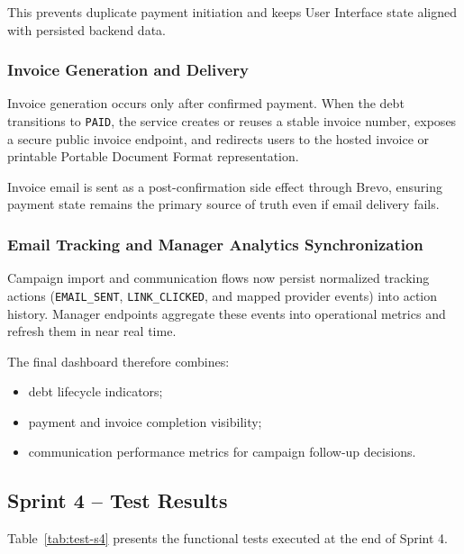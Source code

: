 \documentclass[12pt,a4paper]{report}
\begin{document}
This prevents duplicate payment initiation and keeps User Interface state aligned with persisted backend data.

\subsubsection{Invoice Generation and Delivery}

Invoice generation occurs only after confirmed payment.
When the debt transitions to \texttt{PAID}, the service creates or reuses a stable
invoice number, exposes a secure public invoice endpoint, and redirects users to the
hosted invoice or printable Portable Document Format representation.

Invoice email is sent as a post-confirmation side effect through Brevo,
ensuring payment state remains the primary source of truth even if email delivery fails.

\subsubsection{Email Tracking and Manager Analytics Synchronization}

Campaign import and communication flows now persist normalized tracking actions
(\texttt{EMAIL\_SENT}, \texttt{LINK\_CLICKED}, and mapped provider events) into action history.
Manager endpoints aggregate these events into operational metrics and refresh them in near real time.

The final dashboard therefore combines:
\begin{itemize}
  \item debt lifecycle indicators;
  \item payment and invoice completion visibility;
  \item communication performance metrics for campaign follow-up decisions.
\end{itemize}

\subsection{Sprint 4 -- Test Results}

Table~\ref{tab:test-s4} presents the functional tests executed at the end of Sprint 4.
\end{document}
